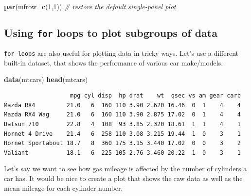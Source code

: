 \documentclass[
]{book}
\newenvironment{Shaded}{\begin{snugshade}}{\end{snugshade}}
\newcommand{\CommentTok}[1]{\textcolor[rgb]{0.56,0.35,0.01}{\textit{#1}}}
\newcommand{\DataTypeTok}[1]{\textcolor[rgb]{0.13,0.29,0.53}{#1}}
\newcommand{\DecValTok}[1]{\textcolor[rgb]{0.00,0.00,0.81}{#1}}
\newcommand{\KeywordTok}[1]{\textcolor[rgb]{0.13,0.29,0.53}{\textbf{#1}}}
\newcommand{\NormalTok}[1]{#1}
\newcommand{\OperatorTok}[1]{\textcolor[rgb]{0.81,0.36,0.00}{\textbf{#1}}}
\newcommand{\StringTok}[1]{\textcolor[rgb]{0.31,0.60,0.02}{#1}}
\begin{document}
\begin{Shaded}
\begin{Highlighting}[]
\KeywordTok{par}\NormalTok{(}\DataTypeTok{mfrow=}\KeywordTok{c}\NormalTok{(}\DecValTok{1}\NormalTok{,}\DecValTok{1}\NormalTok{)) }\CommentTok{# restore the default single-panel plot}
\end{Highlighting}
\end{Shaded}

\hypertarget{using-for-loops-to-plot-subgroups-of-data}{%
\subsection*{\texorpdfstring{Using \texttt{for} loops to plot subgroups of data}{Using for loops to plot subgroups of data}}\label{using-for-loops-to-plot-subgroups-of-data}}

\texttt{for\ loops} are also useful for plotting data in tricky ways. Let's use a different built-in dataset, that shows the performance of various car make/models.

\begin{Shaded}
\begin{Highlighting}[]
\KeywordTok{data}\NormalTok{(mtcars)}
\KeywordTok{head}\NormalTok{(mtcars)}
\end{Highlighting}
\end{Shaded}

\begin{verbatim}
                   mpg cyl disp  hp drat    wt  qsec vs am gear carb
Mazda RX4         21.0   6  160 110 3.90 2.620 16.46  0  1    4    4
Mazda RX4 Wag     21.0   6  160 110 3.90 2.875 17.02  0  1    4    4
Datsun 710        22.8   4  108  93 3.85 2.320 18.61  1  1    4    1
Hornet 4 Drive    21.4   6  258 110 3.08 3.215 19.44  1  0    3    1
Hornet Sportabout 18.7   8  360 175 3.15 3.440 17.02  0  0    3    2
Valiant           18.1   6  225 105 2.76 3.460 20.22  1  0    3    1
\end{verbatim}

Let's say we want to see how gas mileage is affected by the number of cylinders a car has. It would be nice to create a plot that shows the raw data as well as the mean mileage for each cylinder number.

\begin{Shaded}
\end{Shaded}
\end{document}
